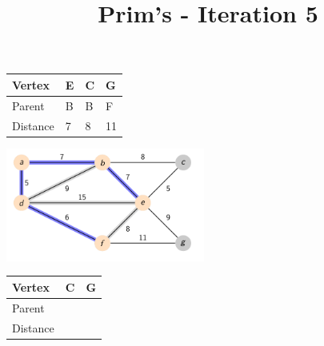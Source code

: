 \documentclass{beamer}
\begin{document}
\begin{frame}[fragile]
    \title{Prim's - Iteration 5}
    \centering
    \begin{table}[]
        \begin{tabular}{|l|l|l|l|}
            \hline
            Vertex   & E & C & G  \\ \hline
            Parent   & B & B & F  \\ \hline
            Distance & 7 & 8 & 11 \\ \hline
        \end{tabular}
    \end{table}
    \includegraphics[width=0.49\textwidth]{./imgs/prims_walkthrough/prims5.png}
    \begin{table}[]
        \begin{tabular}{|l|l|l|}
            \hline
            Vertex   & C & G \\ \hline
            Parent   &  &  \\ \hline
            Distance &  &  \\ \hline
        \end{tabular}
    \end{table}

\end{frame}
\end{document}
